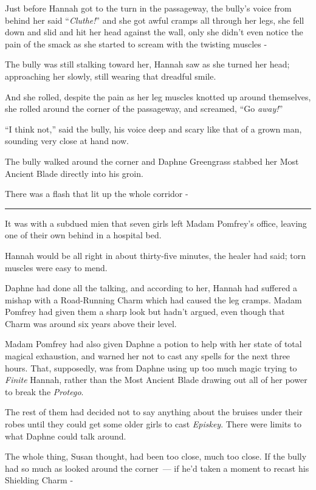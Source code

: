 Just before Hannah got to the turn in the passageway, the bully's voice from behind her said ``\emph{Cluthe!}'' and she got awful cramps all through her legs, she fell down and slid and hit her head against the wall, only she didn't even notice the pain of the smack as she started to scream with the twisting muscles -

The bully was still stalking toward her, Hannah saw as she turned her head; approaching her slowly, still wearing that dreadful smile.

And she rolled, despite the pain as her leg muscles knotted up around themselves, she rolled around the corner of the passageway, and screamed, ``Go \emph{away!}''

``I think not,'' said the bully, his voice deep and scary like that of a grown man, sounding very close at hand now.

The bully walked around the corner and Daphne Greengrass stabbed her Most Ancient Blade directly into his groin.

There was a flash that lit up the whole corridor -

\begin{center}\rule{3in}{0.4pt}\end{center}

It was with a subdued mien that seven girls left Madam Pomfrey's office, leaving one of their own behind in a hospital bed.

Hannah would be all right in about thirty-five minutes, the healer had said; torn muscles were easy to mend.

Daphne had done all the talking, and according to her, Hannah had suffered a mishap with a Road-Running Charm which had caused the leg cramps. Madam Pomfrey had given them a sharp look but hadn't argued, even though that Charm was around six years above their level.

Madam Pomfrey had also given Daphne a potion to help with her state of total magical exhaustion, and warned her not to cast any spells for the next three hours. That, supposedly, was from Daphne using up too much magic trying to \emph{Finite} Hannah, rather than the Most Ancient Blade drawing out all of her power to break the \emph{Protego}.

The rest of them had decided not to say anything about the bruises under their robes until they could get some older girls to cast \emph{Episkey}. There were limits to what Daphne could talk around.

The whole thing, Susan thought, had been too close, much too close. If the bully had so much as looked around the corner~--- if he'd taken a moment to recast his Shielding Charm -

